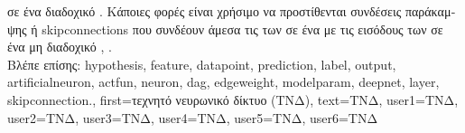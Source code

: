 {{		 \foreignlanguage{greek}{σε ένα διαδοχικό} . \foreignlanguage{greek}{Κάποιες φορές είναι χρήσιμο να 
		προστίθενται συνδέσεις παράκαμψης ή} \glspl{skipconnection} \foreignlanguage{greek}{που συνδέουν άμεσα τις}  
		\foreignlanguage{greek}{των}  \foreignlanguage{greek}{σε ένα}  \foreignlanguage{greek}{με τις εισόδους 
		των}  \foreignlanguage{greek}{σε ένα μη διαδοχικό}  \cite{Goodfellow-et-al-2016}, \cite{HeResidual2016}.
		\\
		\foreignlanguage{greek}{Βλέπε επίσης:} \gls{hypothesis}, \gls{feature}, \gls{datapoint}, \gls{prediction}, \gls{label}, \gls{output}, 
		\gls{artificialneuron}, \gls{actfun}, \gls{neuron}, \gls{dag}, \gls{edgeweight}, \gls{modelparam}, \gls{deepnet}, \gls{layer}, \gls{skipconnection}.},
	first={\foreignlanguage{greek}{τεχνητό νευρωνικό δίκτυο (ΤΝΔ)}},
	text={\foreignlanguage{greek}{ΤΝΔ}},
	user1={\foreignlanguage{greek}{ΤΝΔ}}, %
	user2={\foreignlanguage{greek}{ΤΝΔ}}, %
	user3={\foreignlanguage{greek}{ΤΝΔ}}, %
	user4={\foreignlanguage{greek}{ΤΝΔ}}, %
	user5={\foreignlanguage{greek}{ΤΝΔ}}, %
	user6={\foreignlanguage{greek}{ΤΝΔ}} %
}

